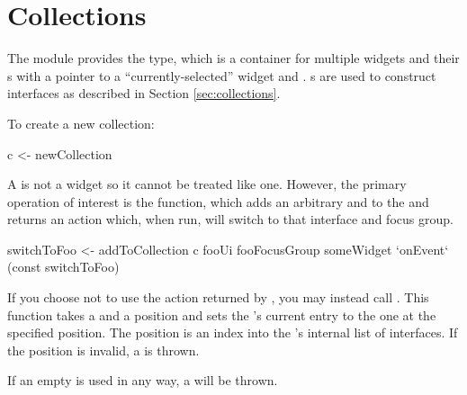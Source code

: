 \section{Collections}

The  module provides the  type, which is
a container for multiple widgets and their s with a
pointer to a ``currently-selected'' widget and .
s are used to construct interfaces as described in
Section \ref{sec:collections}.

To create a new collection:

\begin{haskellcode}
 c <- newCollection
\end{haskellcode}

A  is not a widget so it cannot be treated like one.
However, the primary operation of interest is the 
function, which adds an arbitrary  and  to
the  and returns an  action which, when run,
will switch to that interface and focus group.

\begin{haskellcode}
 switchToFoo <- addToCollection c fooUi fooFocusGroup
 someWidget `onEvent` (const switchToFoo)
\end{haskellcode}

If you choose not to use the  action returned by
, you may instead call .  This
function takes a  and a position and sets the
's current entry to the one at the specified position.
The position is an index into the 's internal list of
interfaces.  If the position is invalid, a  is
thrown.


If an empty  is used in any way, a 
will be thrown.
